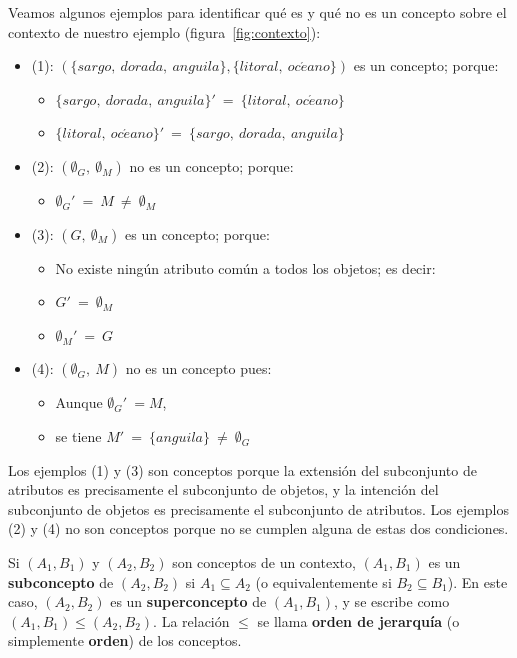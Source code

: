 Veamos algunos ejemplos para identificar qué es y qué no es un concepto sobre el contexto de nuestro ejemplo (figura~\ref{fig:contexto}):
\begin{itemize}
	\item (1): $ (\{sargo,\ dorada,\ anguila\}, \{litoral,\ oc\acute{e}ano\}) $ es un concepto; porque:
	\begin{itemize}
		\item $\{sargo,\ dorada,\ anguila\}'\ =\ \{litoral,\ oc\acute{e}ano\}$
		\item $\{litoral,\ oc\acute{e}ano\}'\ =\ \{sargo,\ dorada,\ anguila\}$
	\end{itemize}
	\item (2): $ (\emptyset_G,\ \emptyset_M) $ no es un concepto; porque:
	\begin{itemize}
		\item $ \emptyset_G'\ =\ M\ \neq\ \emptyset_M $
	\end{itemize}
	\item (3): $ (G,\ \emptyset_M) $ es un concepto; porque:
	\begin{itemize}
		\item No existe ningún atributo común a todos los objetos; es decir:
		\item $ G'\ =\ \emptyset_M $
		\item $ \emptyset_M'\ =\ G $
	\end{itemize}
	\item (4): $ (\emptyset_G,\ M) $ no es un concepto pues:
	\begin{itemize}
		\item Aunque $ \emptyset_G'\ = M $,
		\item se tiene $ M'\ =\ \{anguila\}\ \neq\ \emptyset_G $
	\end{itemize}
\end{itemize}

Los ejemplos (1) y (3) son conceptos porque la extensión del subconjunto de atributos es precisamente el subconjunto de objetos, y la intención del subconjunto de objetos es precisamente el subconjunto de atributos. Los ejemplos (2) y (4) no son conceptos porque no se cumplen alguna de estas dos condiciones.

\begin{defi}
Si $(A_1, B_1)$ y $(A_2, B_2)$ son conceptos de un contexto, $(A_1, B_1)$ es un {\bf subconcepto} de $(A_2, B_2)$ si $A_1 \subseteq A_2$ (o equivalentemente si $B_2 \subseteq B_1$). En este caso, $(A_2, B_2)$ es un {\bf superconcepto} de $(A_1, B_1)$, y se escribe como $(A_1, B_1) \leq (A_2, B_2)$. La relación $\leq$ se llama {\bf orden de jerarquía} (o simplemente {\bf orden}) de los conceptos.
\end{defi}



